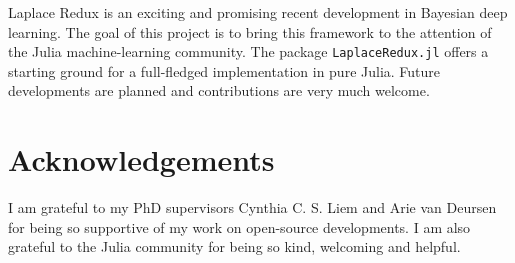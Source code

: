\documentclass{juliacon}
\begin{document}
Laplace Redux is an exciting and promising recent development in
Bayesian deep learning. The goal of this project is to bring this
framework to the attention of the Julia machine-learning community. The
package \texttt{LaplaceRedux.jl} offers a starting ground for a
full-fledged implementation in pure Julia. Future developments are
planned and contributions are very much welcome.

\hypertarget{sec-ack}{%
\section{Acknowledgements}\label{sec-ack}}

I am grateful to my PhD supervisors Cynthia C. S. Liem and Arie van
Deursen for being so supportive of my work on open-source developments.
I am also grateful to the Julia community for being so kind, welcoming
and helpful.


\printbibliography
\end{document}

